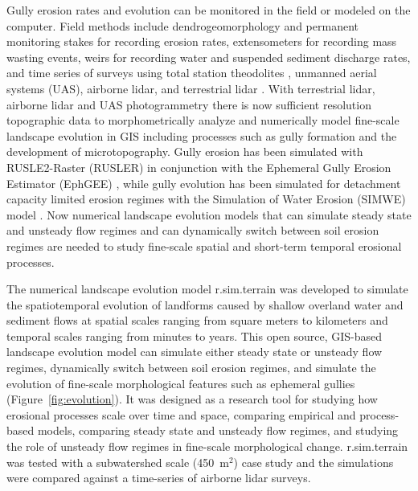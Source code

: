 \documentclass[gmd, manuscript]{copernicus}
\begin{document}
Gully erosion rates and evolution
can be monitored in the field 
or modeled on the computer. 
Field methods include
dendrogeomorphology \citep{Malik2008} and 
permanent monitoring stakes for recording erosion rates, 
extensometers for recording mass wasting events, 
weirs for recording water and suspended sediment discharge rates, 
and time series of surveys using 
total station theodolites \citep{Thomas2004},
unmanned aerial systems (UAS),
airborne lidar, and terrestrial lidar \citep{Starek2011,Bechet2016}.
With terrestrial lidar, airborne lidar and 
UAS photogrammetry
there is now sufficient resolution topographic data 
to morphometrically analyze and 
numerically model fine-scale landscape evolution in GIS
including processes such as gully formation 
and the development of microtopography. 
Gully erosion has been simulated with 
RUSLE2-Raster (RUSLER)
in conjunction with the Ephemeral Gully Erosion Estimator (EphGEE)
\citep{Dabney2014},
while gully evolution
has been simulated for detachment capacity limited erosion regimes
with the Simulation of Water Erosion (SIMWE) model
\citep{Koco2011, Mitasova2013}. 
Now numerical landscape evolution models 
that can simulate 
steady state and unsteady flow regimes
and can dynamically switch between soil erosion regimes 
are needed to study 
fine-scale spatial and short-term temporal erosional processes.

The numerical landscape evolution model 
r.sim.terrain was developed to 
simulate the spatiotemporal evolution of landforms
caused by shallow overland water and sediment flows
at spatial scales ranging from
square meters to kilometers
and temporal scales ranging from minutes to years. 
This open source, GIS-based landscape evolution model can
simulate either steady state or unsteady flow regimes, 
dynamically switch between soil erosion regimes, and
simulate the evolution of fine-scale morphological features 
such as ephemeral gullies
(Figure~\ref{fig:evolution}).
It was designed as a research tool for
studying how erosional processes scale over time and space,
comparing empirical and process-based models, 
comparing steady state and unsteady flow regimes, and
studying the role of unsteady flow regimes 
in fine-scale morphological change. 
r.sim.terrain was tested with 
a subwatershed scale (450~\unit{m}$^{2}$) case study
and the simulations were compared against 
a time-series of airborne lidar surveys.
\end{document}
